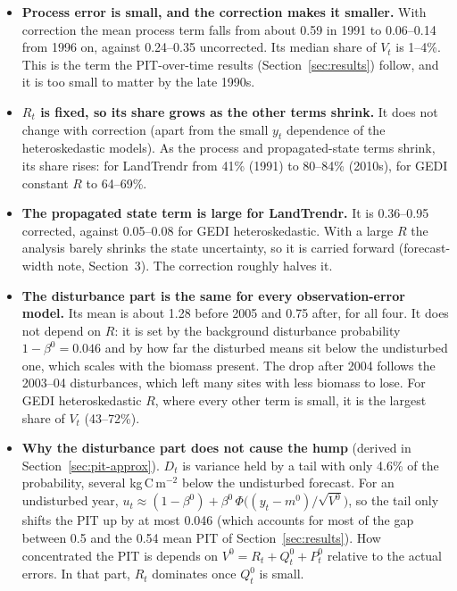 \documentclass[11pt]{article}
\begin{document}
\begin{itemize}
  \item \textbf{Process error is small, and the correction makes it smaller.} With correction the mean process term falls
  from about 0.59 in 1991 to 0.06--0.14 from 1996 on, against 0.24--0.35 uncorrected. Its median
  share of $V_t$ is 1--4\%. This is the term the PIT-over-time results (Section~\ref{sec:results}) follow, and it is too
  small to matter by the late 1990s.
  \item \textbf{$R_t$ is fixed, so its share grows as the other terms shrink.} It does not change with
  correction (apart from the small $y_t$ dependence of the heteroskedastic models). As the
  process and propagated-state terms shrink, its share rises: for LandTrendr from 41\% (1991) to
  80--84\% (2010s), for GEDI constant $R$ to 64--69\%.
  \item \textbf{The propagated state term is large for LandTrendr.} It is 0.36--0.95 corrected, against 0.05--0.08 for
  GEDI heteroskedastic. With a large $R$ the analysis barely shrinks the state uncertainty, so it is carried
  forward (forecast-width note, Section~3). The correction roughly halves it.
  \item \textbf{The disturbance part is the same for every observation-error model.} Its mean is about 1.28 before
  2005 and 0.75 after, for all four. It does not depend on $R$: it is set by the background disturbance
  probability $1 - \beta^0 = 0.046$ and by how far the disturbed means sit below the undisturbed
  one, which scales with the biomass present. The drop after 2004 follows the 2003--04 disturbances,
  which left many sites with less biomass to lose. For GEDI heteroskedastic $R$, where every
  other term is small, it is the largest share of $V_t$ (43--72\%).
  \item \textbf{Why the disturbance part does not cause the hump} (derived in Section~\ref{sec:pit-approx}). $D_t$ is variance held by a
  tail with only 4.6\% of the probability, several kg\,C\,m$^{-2}$ below the undisturbed
  forecast. For an undisturbed year, $u_t \approx (1 - \beta^0) + \beta^0\,
  \Phi\big((y_t - m^0)/\sqrt{V^0}\big)$, so the tail only shifts the PIT up by at most 0.046 (which accounts for most of the gap between 0.5 and the 0.54 mean PIT of Section~\ref{sec:results}). How concentrated the PIT is depends on $V^0 = R_t + Q^0_t + P^0_t$
  relative to the actual errors. In that part, $R_t$ dominates once $Q^0_t$ is small.
\end{itemize}
\end{document}
